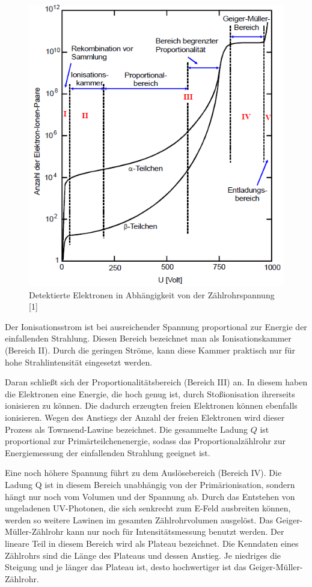 \begin{figure}
  \centering
  \includegraphics[scale=0.4]{content/Bereiche.pg.png}
  \caption{Detektierte Elektronen in Abhängigkeit von der Zählrohrspannung [1]}
  \label{fig:Elektronen}
\end{figure}

Der Ionisationsstrom ist bei ausreichender Spannung proportional zur Energie 
der einfallenden Strahlung. Diesen Bereich bezeichnet man als Ionisationskammer
(Bereich II). Durch die geringen Ströme, kann diese Kammer praktisch nur für hohe 
Strahlintensität eingesetzt werden. 

Daran schließt sich der Proportionalitätsbereich (Bereich III) an. In diesem haben
die Elektronen eine Energie, die hoch genug ist, durch Stoßionisation ihrerseits
ionisieren zu können. Die dadurch erzeugten freien Elektronen können ebenfalls
ionisieren. Wegen des Anstiegs der Anzahl der freien Elektronen wird dieser Prozess
als Townsend-Lawine bezeichnet. Die gesammelte Ladung $Q$ ist proportional zur
Primärteilchenenergie, sodass das Proportionalzählrohr zur Energiemessung der 
einfallenden Strahlung geeignet ist. 

Eine noch höhere Spannung führt zu dem Auslösebereich (Bereich IV). Die Ladung Q 
ist in diesem Bereich unabhängig von der Primärionisation, sondern hängt nur noch
vom Volumen und der Spannung ab. Durch das Entstehen von ungeladenen UV-Photonen, 
die sich senkrecht zum E-Feld ausbreiten können, werden so weitere Lawinen im 
gesamten Zählrohrvolumen ausgelöst. Das Geiger-Müller-Zählrohr kann nur noch für
Intensitätsmessung benutzt werden. Der lineare Teil in diesem Bereich wird als
Plateau bezeichnet. 
Die Kenndaten eines Zählrohrs sind die Länge des Plateaus und dessen Anstieg. Je
niedriges die Steigung und je länger das Plateau ist, desto hochwertiger ist das
Geiger-Müller-Zählrohr. 

